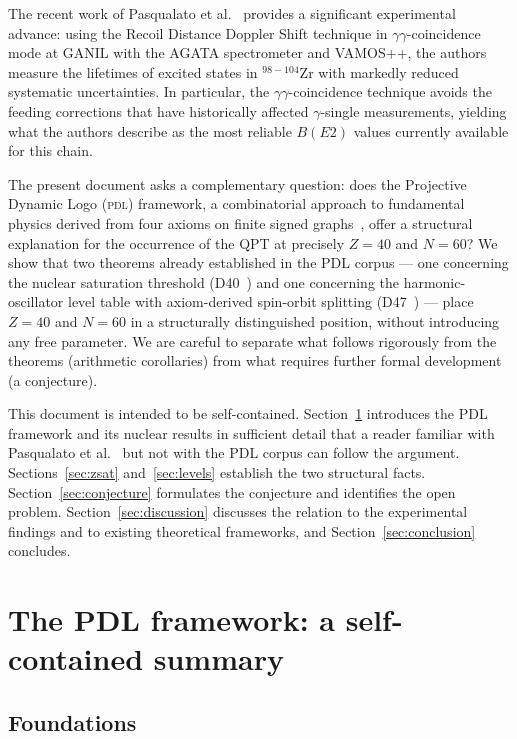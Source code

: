 \documentclass[11pt,a4paper]{article}
\theoremstyle{definition}
\theoremstyle{remark}
\newcommand{\PDL}{\textsc{pdl}}
\begin{document}
The recent work of Pasqualato et al.~\cite{Pasqualato_2024} provides a significant experimental advance: using the Recoil Distance Doppler Shift technique in $\gamma\gamma$-coincidence mode at GANIL with the AGATA spectrometer and VAMOS++, the authors measure the lifetimes of excited states in $^{98-104}$Zr with markedly reduced systematic uncertainties. In particular, the $\gamma\gamma$-coincidence technique avoids the feeding corrections that have historically affected $\gamma$-single measurements, yielding what the authors describe as the most reliable $B(E2)$ values currently available for this chain.

The present document asks a complementary question: does the Projective Dynamic Logo (\PDL) framework, a combinatorial approach to fundamental physics derived from four axioms on finite signed graphs~\cite{PDL_DM}, offer a structural explanation for the occurrence of the QPT at precisely $Z=40$ and $N=60$? We show that two theorems already established in the PDL corpus --- one concerning the nuclear saturation threshold (D40~\cite{PDL_D40}) and one concerning the harmonic-oscillator level table with axiom-derived spin-orbit splitting (D47~\cite{PDL_D47}) --- place $Z=40$ and $N=60$ in a structurally distinguished position, without introducing any free parameter. We are careful to separate what follows rigorously from the theorems (arithmetic corollaries) from what requires further formal development (a conjecture).

This document is intended to be self-contained. Section~\ref{sec:pdl} introduces the PDL framework and its nuclear results in sufficient detail that a reader familiar with Pasqualato et al.~\cite{Pasqualato_2024} but not with the PDL corpus can follow the argument. Sections~\ref{sec:zsat} and~\ref{sec:levels} establish the two structural facts. Section~\ref{sec:conjecture} formulates the conjecture and identifies the open problem. Section~\ref{sec:discussion} discusses the relation to the experimental findings and to existing theoretical frameworks, and Section~\ref{sec:conclusion} concludes.

\section{The PDL framework: a self-contained summary}
\label{sec:pdl}

\subsection{Foundations}
\label{subsec:foundations}
\end{document}

